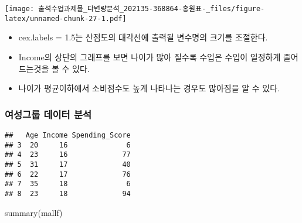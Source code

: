 \documentclass[
]{article}
\newenvironment{Shaded}{\begin{snugshade}}{\end{snugshade}}
\newcommand{\AttributeTok}[1]{\textcolor[rgb]{0.77,0.63,0.00}{#1}}
\newcommand{\CommentTok}[1]{\textcolor[rgb]{0.56,0.35,0.01}{\textit{#1}}}
\newcommand{\DecValTok}[1]{\textcolor[rgb]{0.00,0.00,0.81}{#1}}
\newcommand{\FloatTok}[1]{\textcolor[rgb]{0.00,0.00,0.81}{#1}}
\newcommand{\FunctionTok}[1]{\textcolor[rgb]{0.00,0.00,0.00}{#1}}
\newcommand{\NormalTok}[1]{#1}
\newcommand{\OtherTok}[1]{\textcolor[rgb]{0.56,0.35,0.01}{#1}}
\newcommand{\SpecialCharTok}[1]{\textcolor[rgb]{0.00,0.00,0.00}{#1}}
\newcommand{\StringTok}[1]{\textcolor[rgb]{0.31,0.60,0.02}{#1}}
\providecommand{\tightlist}{%
  \setlength{\itemsep}{0pt}\setlength{\parskip}{0pt}}
\begin{document}
\begin{Shaded}
\end{Shaded}

\texttt{[image: 출석수업과제물\_다변량분석\_202135-368864-홍원표-\_files/figure-latex/unnamed-chunk-27-1.pdf]}

\begin{itemize}
\tightlist
\item
  cex.labels = 1.5는 산점도의 대각선에 출력될 변수명의 크기를 조절한다.
\item
  Income의 상단의 그래프를 보면 나이가 많아 질수록 수입은 수입이
  일정하게 줄어드는것을 볼 수 있다.
\item
  나이가 평균이하에서 소비점수도 높게 나타나는 경우도 많아짐을 알 수
  있다.
\end{itemize}

\hypertarget{uxc5ecuxc131uxadf8uxb8f9-uxb370uxc774uxd130-uxbd84uxc11d}{%
\subsubsection{여성그룹 데이터
분석}\label{uxc5ecuxc131uxadf8uxb8f9-uxb370uxc774uxd130-uxbd84uxc11d}}

\begin{Shaded}
\end{Shaded}

\begin{verbatim}
##   Age Income Spending_Score
## 3  20     16              6
## 4  23     16             77
## 5  31     17             40
## 6  22     17             76
## 7  35     18              6
## 8  23     18             94
\end{verbatim}

\begin{Shaded}
\begin{Highlighting}[]
\FunctionTok{summary}\NormalTok{(mallf)}
\end{Highlighting}
\end{Shaded}
\end{document}
